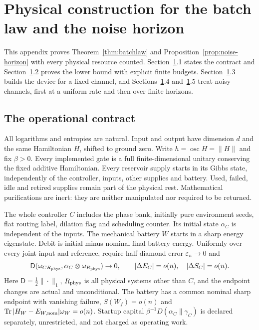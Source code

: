 \documentclass[11pt]{article}
\theoremstyle{definition}
\theoremstyle{remark}
\newcommand{\Tr}{\operatorname{Tr}}
\providecommand{\osc}{\operatorname{osc}}
\providecommand{\D}{\mathsf D}
\begin{document}
\section{Physical construction for the batch law and the noise horizon}\label{app:batchphys}

This appendix proves Theorem~\ref{thm:batchlaw} and Proposition~\ref{prop:noise-horizon} with every physical resource counted. Section~\ref{app:batchphys}.1 states the contract and Section~\ref{app:batchphys}.2 proves the lower bound with explicit finite budgets. Section~\ref{app:batchphys}.3 builds the device for a fixed channel, and Sections~\ref{app:batchphys}.4 and~\ref{app:batchphys}.5 treat noisy channels, first at a uniform rate and then over finite horizons.

\subsection{The operational contract}\label{bp-contract}
All logarithms and entropies are natural. Input and output have
dimension $d$ and the same Hamiltonian $H$, shifted to ground zero.
Write $h=\osc H=\|H\|$ and fix $\beta>0$. Every implemented gate is a full
finite-dimensional unitary conserving the fixed additive Hamiltonian.
Every reservoir supply starts in its Gibbs state, independently of
the controller, inputs, other supplies and battery. Used, failed, idle and
retired supplies remain part of the physical rest. Mathematical purifications are
inert: they are neither manipulated nor required to be returned.

The whole controller $C$ includes the phase bank, initially pure environment
seeds, flat routing label, dilation flag and scheduling counter. Its initial
state $\alpha_C$ is independent of the inputs. The mechanical battery
$W$ starts in a sharp energy eigenstate. Debit is initial minus nominal
final battery energy. Uniformly over every joint input and reference,
require half diamond error $\varepsilon_n\to0$ and
\[
 \D(\omega_{C R_{\rm phys}},\alpha_C\otimes\omega_{R_{\rm phys}})\to0,
 \qquad |\Delta E_C|=o(n),\quad |\Delta S_C|=o(n).
\]
Here $\D=\frac12\|\cdot\|_1$, $R_{\rm phys}$ is all physical systems other
than $C$, and the endpoint changes are actual and unconditional.
The battery has a common nominal sharp endpoint with vanishing failure,
$S(W_f)=o(n)$ and $\Tr|H_W-E_{W,\rm nom}|\omega_W=o(n)$.
Startup capital $\beta^{-1}D(\alpha_C\|\gamma_C)$ is declared separately,
unrestricted, and not charged as operating work.
\end{document}
